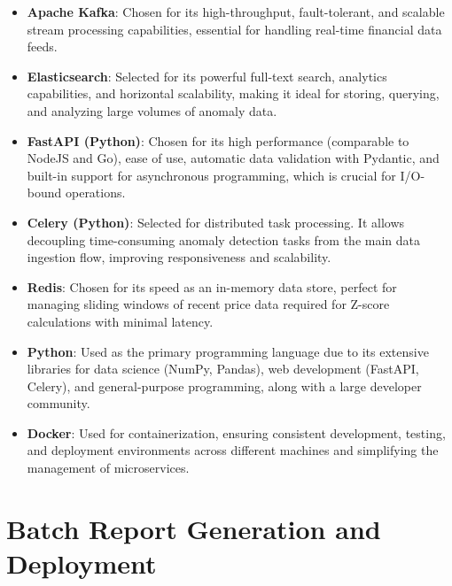 \begin{itemize}
    \item \textbf{Apache Kafka}: Chosen for its high-throughput, fault-tolerant, and scalable stream processing capabilities, essential for handling real-time financial data feeds.
    
    \item \textbf{Elasticsearch}: Selected for its powerful full-text search, analytics capabilities, and horizontal scalability, making it ideal for storing, querying, and analyzing large volumes of anomaly data.
    
    \item \textbf{FastAPI (Python)}: Chosen for its high performance (comparable to NodeJS and Go), ease of use, automatic data validation with Pydantic, and built-in support for asynchronous programming, which is crucial for I/O-bound operations.
    
    \item \textbf{Celery (Python)}: Selected for distributed task processing. It allows decoupling time-consuming anomaly detection tasks from the main data ingestion flow, improving responsiveness and scalability.
    
    \item \textbf{Redis}: Chosen for its speed as an in-memory data store, perfect for managing sliding windows of recent price data required for Z-score calculations with minimal latency.
    
    \item \textbf{Python}: Used as the primary programming language due to its extensive libraries for data science (NumPy, Pandas), web development (FastAPI, Celery), and general-purpose programming, along with a large developer community.
    
    \item \textbf{Docker}: Used for containerization, ensuring consistent development, testing, and deployment environments across different machines and simplifying the management of microservices.
\end{itemize}

\section{Batch Report Generation and Deployment}









